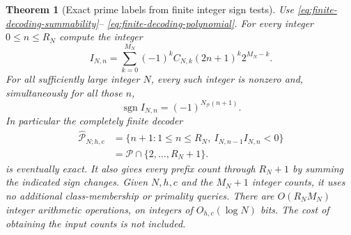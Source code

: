 \documentclass[11pt]{article}
\newtheorem{theorem}{Theorem}[section]
\theoremstyle{definition}
\begin{document}
\begin{theorem}[Exact prime labels from finite integer sign tests]
\label{thm:finite-integer-prime-decoding}
Use \eqref{eq:finite-decoding-summability}--%
\eqref{eq:finite-decoding-polynomial}.
For every integer $0\le n\le R_N$ compute the integer
\begin{equation}
 I_{N,n}=\sum_{k=0}^{M_N}(-1)^k C_{N,k}
                       (2n+1)^k2^{M_N-k}.
 \label{eq:finite-decoding-integer-probe}
\end{equation}
For all sufficiently large integer $N$, every such integer
is nonzero and, simultaneously for all those $n$,
\begin{equation}
 \operatorname{sgn}I_{N,n}
                 =(-1)^{N_{\mathcal P}(n+1)} .
 \label{eq:finite-decoding-sign-parity}
\end{equation}
In particular the completely finite decoder
\begin{equation}
 \begin{aligned}
 \widehat{\mathcal P}_{N;h,c}
  &=\{n+1:1\le n\le R_N,\ I_{N,n-1}I_{N,n}<0\}\\
  &=\mathcal P\cap\{2,\ldots,R_N+1\}.
 \end{aligned}
 \label{eq:finite-decoding-exact-class}
\end{equation}
is eventually exact.
It also gives every prefix count through $R_N+1$ by summing
the indicated sign changes.
Given $N,h,c$ and the $M_N+1$ integer counts, it uses no
additional class-membership or primality queries.
There are $O(R_NM_N)$ integer arithmetic operations, on integers
of $O_{h,c}(\log N)$ bits.
The cost of obtaining the input counts is not included.
\end{theorem}
\end{document}
